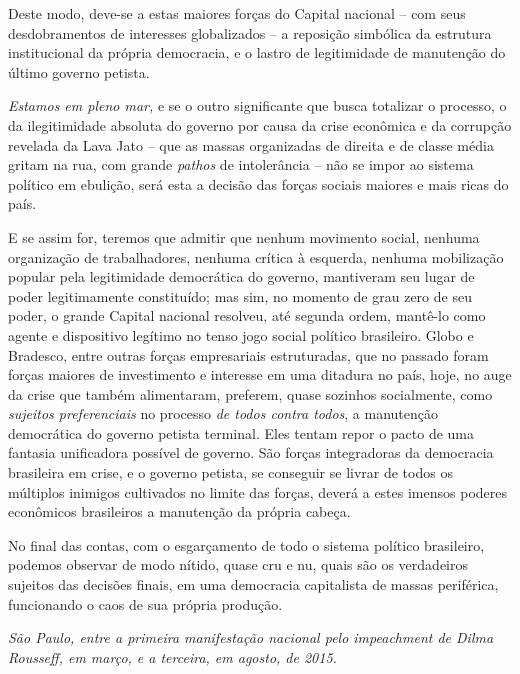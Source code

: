 Deste modo, deve-se a estas maiores forças do Capital nacional -- com
seus desdobramentos de interesses globalizados -- a reposição simbólica
da estrutura institucional da própria democracia, e o lastro de
legitimidade de manutenção do último governo petista.

\emph{Estamos em pleno mar,} e se o outro significante que busca
totalizar o processo, o da ilegitimidade absoluta do governo por causa
da crise econômica e da corrupção revelada da Lava Jato -- que as massas
organizadas de direita e de classe média gritam na rua, com grande
\emph{pathos} de intolerância -- não se impor ao sistema político em
ebulição, será esta a decisão das forças sociais maiores e mais ricas do
país.

E se assim for, teremos que admitir que nenhum movimento social, nenhuma
organização de trabalhadores, nenhuma crítica à esquerda, nenhuma
mobilização popular pela legitimidade democrática do governo, mantiveram
seu lugar de poder legitimamente constituído; mas sim, no momento de
grau zero de seu poder, o grande Capital nacional resolveu, até segunda
ordem, mantê-lo como agente e dispositivo legítimo no tenso jogo social
político brasileiro. Globo e Bradesco, entre outras forças empresariais
estruturadas, que no passado foram forças maiores de investimento e
interesse em uma ditadura no país, hoje, no auge da crise que também
alimentaram, preferem, quase sozinhos socialmente, como \emph{sujeitos
preferenciais} no processo \emph{de todos contra todos}, a manutenção
democrática do governo petista terminal. Eles tentam repor o pacto de
uma fantasia unificadora possível de governo. São forças integradoras da
democracia brasileira em crise, e o governo petista, se conseguir se
livrar de todos os múltiplos inimigos cultivados no limite das forças,
deverá a estes imensos poderes econômicos brasileiros a manutenção da
própria cabeça.

No final das contas, com o esgarçamento de todo o sistema político
brasileiro, podemos observar de modo nítido, quase cru e nu, quais são
os verdadeiros sujeitos das decisões finais, em uma democracia
capitalista de massas periférica, funcionando o caos de sua própria
produção.

\hfill\begin{minipage}{.7\textwidth}
\emph{São Paulo, entre a primeira manifestação nacional pelo impeachment
de Dilma Rousseff, em março, e a terceira, em agosto, de 2015.}
\end{minipage}
